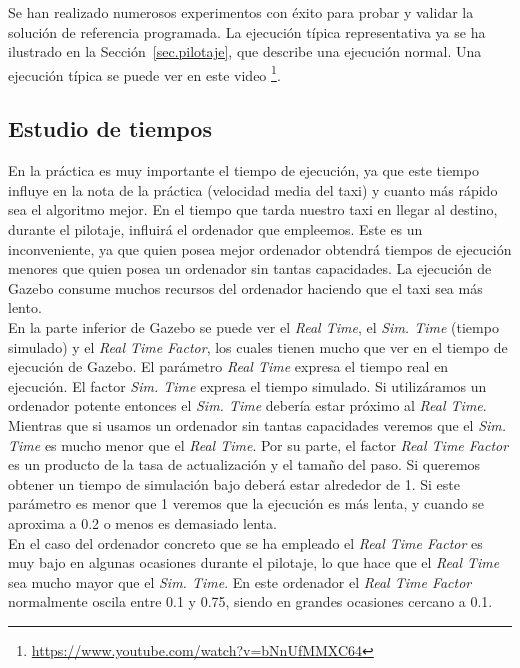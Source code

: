 Se han realizado numerosos experimentos con éxito para probar y validar la solución de referencia programada. La ejecución típica representativa ya se ha ilustrado en la Sección~\ref{sec.pilotaje}, que describe una ejecución normal. Una ejecución típica se puede ver en este video \footnote{\url{https://www.youtube.com/watch?v=bNnUfMMXC64}}. 

\subsection{Estudio de tiempos}

En la práctica es muy importante el tiempo de ejecución, ya que este tiempo influye en la nota de la práctica (velocidad media del taxi) y cuanto más rápido sea el algoritmo mejor. En el tiempo que tarda nuestro taxi en llegar al destino, durante el pilotaje, influirá el ordenador que empleemos. Este es un inconveniente, ya que quien posea mejor ordenador obtendrá tiempos de ejecución menores que quien posea un ordenador sin tantas capacidades. La ejecución de Gazebo consume muchos recursos del ordenador haciendo que el taxi sea más lento. \\

En la parte inferior de Gazebo se puede ver el \textit{Real Time}, el \textit{Sim. Time} (tiempo simulado) y el \textit{Real Time Factor}, los cuales tienen mucho que ver en el tiempo de ejecución de Gazebo. El parámetro \textit{Real Time} expresa el tiempo real en ejecución. El factor \textit{Sim. Time} expresa el tiempo simulado. Si utilizáramos un ordenador potente entonces el \textit{Sim. Time} debería estar próximo al \textit{Real Time}. Mientras que si usamos un ordenador sin tantas capacidades veremos que el \textit{Sim. Time} es mucho menor que el \textit{Real Time}. Por su parte, el factor \textit{Real Time Factor} es un producto de la tasa de actualización y el tamaño del paso. Si queremos obtener un tiempo de simulación bajo deberá estar alrededor de 1. Si este parámetro es menor que 1 veremos que la ejecución es más lenta, y cuando se aproxima a 0.2 o menos es demasiado lenta.\\

En el caso del ordenador concreto que se ha empleado el \textit{Real Time Factor} es muy bajo en algunas ocasiones durante el pilotaje, lo que hace que el \textit{Real Time} sea mucho mayor que el \textit{Sim. Time}. En este ordenador el \textit{Real Time Factor} normalmente oscila entre 0.1 y 0.75, siendo en grandes ocasiones cercano a 0.1. \\

